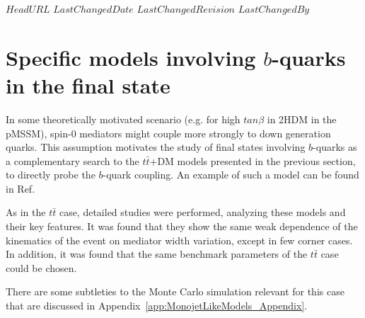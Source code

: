 \svnidlong
{$HeadURL$}
{$LastChangedDate$}
{$LastChangedRevision$}
{$LastChangedBy$}

\section{Specific models involving $b$-quarks in the final state}

In some theoretically motivated scenario (e.g. for high $tan\beta$ in 2HDM in the pMSSM), 
spin-0 mediators might couple more strongly to down generation quarks.
 This assumption motivates the study of final states involving $b$-quarks 
 as a complementary search to the $t\bar
t$+DM models presented in the previous section, to directly probe the $b$-quark coupling. 
An example of such a model can be found in Ref.~\cite{Buckley:2014fba}

As in the $t\bar t$ case, detailed studies were performed, analyzing 
these models and their key features. It was found that they show the
same weak dependence of the kinematics of the event on mediator width
variation, except in few corner cases. In addition, it was found that
the same benchmark parameters of the $t\bar t$ case could be chosen.

There are some subtleties to the Monte Carlo simulation relevant for
this case that are discussed in Appendix~\ref{app:MonojetLikeModels_Appendix}.

%
%
